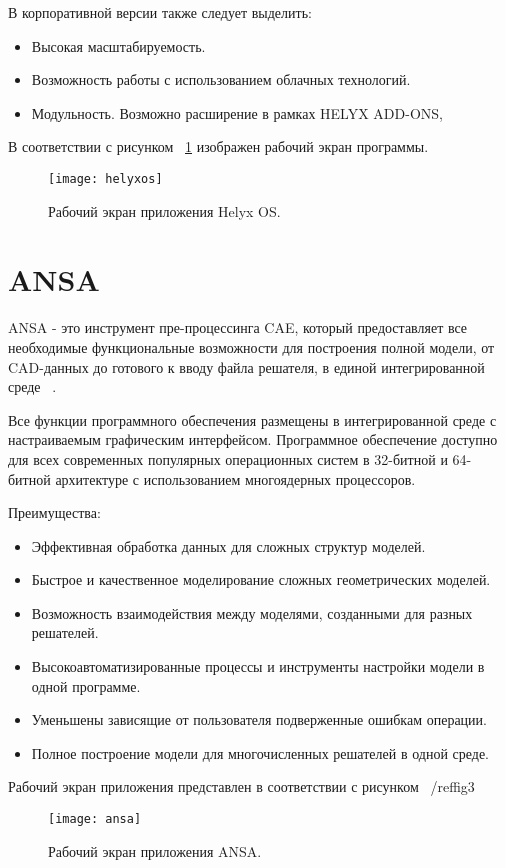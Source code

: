 \documentclass[14pt]{extreport}
\begin{document}
В корпоративной версии также следует выделить:
\begin{itemize}
\item Высокая масштабируемость.
\item Возможность работы с использованием облачных технологий.
\item Модульность. Возможно расширение в рамках HELYX ADD-ONS, 
\end{itemize}

В соответствии с рисунком ~\ref{fig2} изображен рабочий экран программы.

\begin{figure}[H]
\centerline{\texttt{[image: helyxos]}}
\caption{Рабочий экран приложения Helyx OS.}
\label{fig2}
\end{figure}

\section{ANSA}
ANSA - это инструмент пре-процессинга CAE, который предоставляет все необходимые функциональные возможности для построения полной модели, от CAD-данных  до готового к вводу файла решателя, в единой интегрированной среде ~\cite{Ansa}.

Все функции программного обеспечения размещены в интегрированной среде с настраиваемым графическим интерфейсом. Программное обеспечение доступно для всех современных популярных операционных систем в 32-битной и 64-битной архитектуре с использованием многоядерных процессоров. 

Преимущества: 
\begin{itemize}
\item Эффективная обработка данных для сложных структур моделей.
\item Быстрое и качественное моделирование сложных геометрических моделей.
\item Возможность взаимодействия между моделями, созданными для разных решателей.
\item Высокоавтоматизированные процессы и инструменты настройки модели в одной программе.
\item Уменьшены зависящие от пользователя подверженные ошибкам операции.
\item Полное построение модели для многочисленных решателей в одной среде.
\end{itemize}
Рабочий экран приложения представлен в соответствии с рисунком ~/ref{fig3}

\begin{figure}[H]
\centerline{\texttt{[image: ansa]}}
\caption{Рабочий экран приложения ANSA.}
\label{fig3}
\end{figure}
\end{document}
